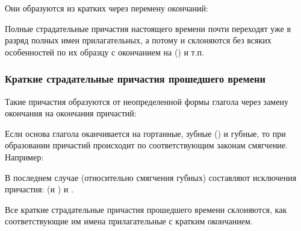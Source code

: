 \documentclass[11pt,a4paper,oneside]{memoir}
\begin{document}
    Они образуются из кратких через перемену окончаний:
    
    \bigskip{}

    Полные страдательные причастия настоящего времени почти переходят уже в разряд полных имен прилагательных, а потому и склоняются без всяких особенностей по их образцу с окончанием на {} ({}) и т.п.

                \subsubsection{Краткие страдательные причастия прошедшего времени}

    Такие причастия образуются от неопределенной формы глагола через замену окончания {} на окончания причастий:
    
    \bigskip{}

    Если основа глагола оканчивается на гортанные, зубные ({}) и губные, то при образовании причастий происходит по соответствующим законам смягчение. Например:
    
    \bigskip{}

    В последнем случае (относительно смягчения губных) составляют исключения причастия: {} (и {}) и {}.
    
    Все краткие страдательные причастия прошедшего времени склоняются, как соответствующие им имена прилагательные с кратким окончанием.
\end{document}

